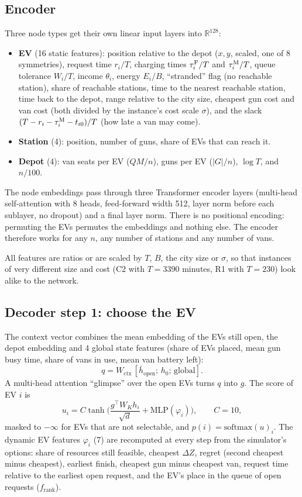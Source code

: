 \subsection{Encoder}

Three node types get their own linear input layers into $\mathbb R^{128}$:
\begin{itemize}
  \item \textbf{EV} (16 static features): position relative to the depot ($x,y$, scaled, one of 8 symmetries), request time $r_i/T$, charging times $\tau^{\mathrm{F}}_i/T$ and $\tau^{\mathrm{M}}_i/T$, queue tolerance $W_i/T$, income $\theta_i$, energy $E_i/B$, ``stranded'' flag (no reachable station), share of reachable stations, time to the nearest reachable station, time back to the depot, range relative to the city size, cheapest gun cost and van cost (both divided by the instance's cost scale $\sigma$), and the slack $(T-r_i-\tau^{\mathrm{M}}_i-t_{i0})/T$ (how late a van may come).
  \item \textbf{Station} (4): position, number of guns, share of EVs that can reach it.
  \item \textbf{Depot} (4): van seats per EV ($QM/n$), guns per EV ($|G|/n$), $\log T$, and $n/100$.
\end{itemize}
The node embeddings pass through three Transformer encoder layers (multi-head self-attention with 8 heads, feed-forward width 512, layer norm before each sublayer, no dropout) and a final layer norm. There is no positional encoding: permuting the EVs permutes the embeddings and nothing else. The encoder therefore works for any $n$, any number of stations and any number of vans.

All features are ratios or are scaled by $T$, $B$, the city size or $\sigma$, so that instances of very different size and cost (C2 with $T=3390$ minutes, R1 with $T=230$) look alike to the network.

\subsection{Decoder step 1: choose the EV}

The context vector combines the mean embedding of the EVs still open, the depot embedding and 4 global state features (share of EVs placed, mean gun busy time, share of vans in use, mean van battery left):
\[
q=W_{\text{ctx}}\,[\bar h_{\text{open}};\,h_0;\,\text{global}] .
\]
A multi-head attention ``glimpse'' over the open EVs turns $q$ into $g$. The score of EV $i$ is
\[
u_i=C\tanh\!\Big(\frac{g^\top W_K h_i}{\sqrt d}+\mathrm{MLP}(\varphi_i)\Big),\qquad C=10,
\]
masked to $-\infty$ for EVs that are not selectable, and $p(i)=\mathrm{softmax}(u)_i$. The dynamic EV features $\varphi_i$ (7) are recomputed at every step from the simulator's options: share of resources still feasible, cheapest $\Delta Z$, regret (second cheapest minus cheapest), earliest finish, cheapest gun minus cheapest van, request time relative to the earliest open request, and the EV's place in the queue of open requests ($f_{\text{rank}}$).

